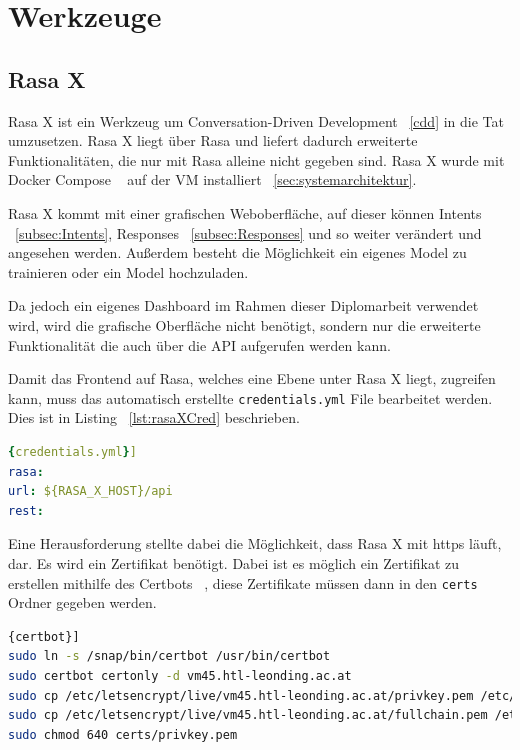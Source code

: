 \section{Werkzeuge}

\subsection{Rasa X}\label{subsec:rasa-x}
Rasa X ist ein Werkzeug um Conversation-Driven Development ~\ref{cdd} in die Tat umzusetzen.\cite{rasax}
Rasa X liegt über Rasa und liefert dadurch erweiterte Funktionalitäten, die nur mit Rasa alleine nicht gegeben sind.
Rasa X wurde mit Docker Compose ~\cite{rasaxDocker} auf der VM installiert ~\ref{sec:systemarchitektur}.

Rasa X kommt mit einer grafischen Weboberfläche, auf dieser können Intents ~\ref{subsec:Intents}, Responses ~\ref{subsec:Responses} und so weiter verändert und angesehen werden.
Außerdem besteht die Möglichkeit ein eigenes Model zu trainieren oder ein Model hochzuladen.

Da jedoch ein eigenes Dashboard im Rahmen dieser Diplomarbeit verwendet wird, wird die grafische Oberfläche nicht benötigt, sondern nur die erweiterte Funktionalität die auch über die API aufgerufen werden kann.

Damit das Frontend auf Rasa, welches eine Ebene unter Rasa X liegt, zugreifen kann, muss das automatisch erstellte \texttt{credentials.yml} File bearbeitet werden.
Dies ist in Listing ~\ref{lst:rasaXCred} beschrieben.

\begin{lstlisting}[language=yaml,label={lst:rasaXCred},caption={credentials.yml}]{credentials.yml}]
rasa:
url: ${RASA_X_HOST}/api
rest:
\end{lstlisting}

Eine Herausforderung stellte dabei die Möglichkeit, dass Rasa X mit https läuft, dar.
Es wird ein Zertifikat benötigt.
Dabei ist es möglich ein Zertifikat zu erstellen mithilfe des Certbots ~\cite{certbot}, diese Zertifikate müssen dann in den \texttt{certs} Ordner gegeben werden.

\begin{lstlisting}[language=bash,label={lst:certbot},caption={Install certbot and create certificates}]{certbot}]
sudo ln -s /snap/bin/certbot /usr/bin/certbot
sudo certbot certonly -d vm45.htl-leonding.ac.at
sudo cp /etc/letsencrypt/live/vm45.htl-leonding.ac.at/privkey.pem /etc/rasa/certs/
sudo cp /etc/letsencrypt/live/vm45.htl-leonding.ac.at/fullchain.pem /etc/rasa/certs/
sudo chmod 640 certs/privkey.pem
\end{lstlisting}

